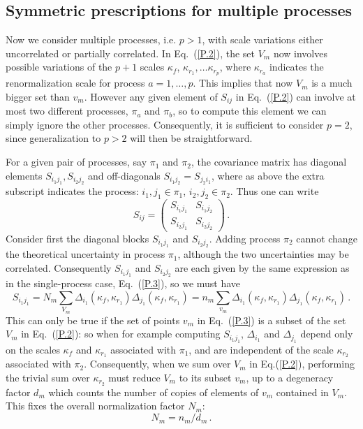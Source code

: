 \subsection{Symmetric prescriptions for multiple processes}
\label{sec:sympresmul}


Now we consider multiple processes, i.e. $p>1$, with scale variations
either uncorrelated or partially correlated.
%
In Eq.~(\ref{P.2}), the set $V_m$ now involves possible variations
of the $p+1$ scales $\kappa_f$, $\kappa_{r_1},\ldots\kappa_{r_p}$, where $\kappa_{r_a}$ indicates
the renormalization
scale for process $a=1,\ldots,p$.
%
This implies that now
  $V_m$ is a much bigger set than $v_m$.
%
  However any given element of $S_{ij}$
in Eq.~(\ref{P.2}) can involve at most two different processes, $\pi_a$
and $\pi_b$, so to compute this element we can simply ignore the other
processes.
%
Consequently, it is sufficient to consider $p=2$, since
generalization to $p>2$ will then be straightforward.  

For a given pair of processes, say $\pi_1$ and $ \pi_2$, the
covariance matrix has
diagonal elements $S_{i_1j_1}, S_{i_2j_2}$ and off-diagonals
$S_{i_1j_2} = S_{j_2i_1}$, where as above the extra subscript indicates the
process: $i_1,j_1\in\pi_1$, $i_2,j_2\in\pi_2$.
%
Thus one can write
\begin{equation}
  \label{P.2.2}
  S_{ij} = \left(\begin{array}{cc}
S_{i_1j_1}&S_{i_1j_2}\\ 
S_{i_2j_1}&S_{i_2j_2}\end{array}\right)\, .
\end{equation} 
Consider first the diagonal blocks $S_{i_1j_1}$ and
$S_{i_2j_2}$.
%
Adding process $\pi_2$ cannot change the theoretical
uncertainty in process $\pi_1$, although the two uncertainties may be
correlated.
%
Consequently $S_{i_1j_1}$ and $S_{i_2j_2}$ are each given
by the same expression as in the single-process case, Eq.~(\ref{P.3}), so we must have 
 \begin{equation} \label{P.2.3}
S_{i_1j_1}= N_m \sum_{V_m} \Delta_{i_1} (\kappa_f, \kappa_{r_1}) \Delta_{j_1} (\kappa_f, \kappa_{r_1})=
n_{m} \sum_{v_{m}} \Delta_{i_1} (\kappa_f, \kappa_{r_1})\Delta_{j_1} (\kappa_f, \kappa_{r_1}) \, .
\end{equation}
 This can only be true if the set of points $v_m$ in
 Eq.~(\ref{P.3}) is a
subset of the set $V_m$ in Eq.~(\ref{P.2}): so when for example computing
$S_{i_1j_1}$, $\Delta_{i_1}$ and $\Delta_{j_1}$ depend only on the
scales $\kappa_f$ and $\kappa_{r_1}$ associated with $\pi_1$, and are
independent of the scale $\kappa_{r_2}$ associated with $\pi_2$.
%
Consequently, when we sum over $V_m$ in Eq.(\ref{P.2}), performing the
trivial sum over $\kappa_{r_2}$ must reduce $V_m$ to its subset $v_m$, up
to a degeneracy factor $d_m$ which counts the number of copies of
elements of $v_m$ contained in $V_m$.
%
This fixes the overall
normalization factor $N_m$: 
\begin{equation} \label{P.5}
N_m = n_m/d_m \, .
\end{equation}

